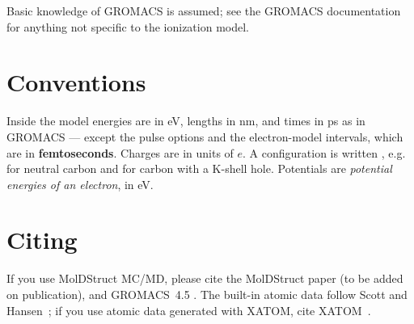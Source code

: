 Basic knowledge of GROMACS is assumed; see the GROMACS documentation for anything not specific to the ionization
model.

\section{Conventions}

Inside the model energies are in eV, lengths in nm, and times in ps as in GROMACS --- except the pulse options and
the electron-model intervals, which are in \textbf{femtoseconds}.
Charges are in units of $e$.
A configuration is written , e.g.\  for neutral carbon and  for carbon with a
K-shell hole.
Potentials are \emph{potential energies of an electron}, in eV.

\section{Citing}

If you use MolDStruct MC/MD, please cite the MolDStruct paper (to be added on publication), and GROMACS~4.5
\cite{pronk2013}.
The built-in atomic data follow Scott and Hansen~\cite{scott2010}; if you use atomic data generated with XATOM, cite
XATOM~\cite{jurek2016}.

